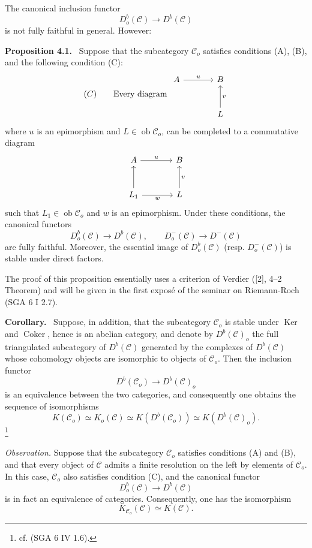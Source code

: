 \documentclass[11pt]{article}
\newenvironment{statement}[1]{\par\medskip\noindent\textbf{#1.}\ }{\par\medskip}
\providecommand{\Ker}{\operatorname{Ker}}
\providecommand{\Coker}{\operatorname{Coker}}
\providecommand{\Ob}{\operatorname{ob}}
\providecommand{\cC}{\mathcal C}
\providecommand{\Ker}{\operatorname{Ker}}
\providecommand{\Coker}{\operatorname{Coker}}
\providecommand{\Ker}{\operatorname{Ker}}
\providecommand{\Coker}{\operatorname{Coker}}
\providecommand{\Ob}{\operatorname{ob}}
\providecommand{\cC}{\mathcal C}
\providecommand{\Ob}{\operatorname{Ob}}
\providecommand{\Ob}{\operatorname{ob}}
\providecommand{\Ob}{\operatorname{Ob}}
\begin{document}
The canonical inclusion functor
\[
D_o^b(\cC)\longrightarrow D^b(\cC)
\]
is not fully faithful in general. However:

\begin{statement}{Proposition 4.1}
Suppose that the subcategory $\cC_o$ satisfies conditions (A), (B), and the following condition (C):
\[
(C)\qquad
\text{Every diagram }
\begin{tikzcd}[column sep=large,row sep=large]
A \arrow[r,"u"]&B\\
&L \arrow[u,"v"']
\end{tikzcd}
\]
where $u$ is an epimorphism and $L\in\Ob\cC_o$, can be completed to a commutative diagram
\[
\begin{tikzcd}[column sep=large,row sep=large]
A \arrow[r,"u"]&B\\
L_1 \arrow[u] \arrow[r,"w"']&L \arrow[u,"v"']
\end{tikzcd}
\]
such that $L_1\in\Ob\cC_o$ and $w$ is an epimorphism. Under these conditions, the canonical functors
\[
D_o^b(\cC)\longrightarrow D^b(\cC),\qquad
D_o^-(\cC)\longrightarrow D^-(\cC)
\]
are fully faithful. Moreover, the essential image of $D_o^b(\cC)$ (resp. $D_o^-(\cC)$) is stable under direct factors.
\end{statement}

The proof of this proposition essentially uses a criterion of Verdier ([2], 4--2 Theorem) and will be given in the first exposé of the seminar on Riemann-Roch (SGA 6 I 2.7).

\begin{statement}{Corollary}
Suppose, in addition, that the subcategory $\cC_o$ is stable under $\Ker$ and $\Coker$, hence is an abelian category, and denote by $D^b(\cC)_o$ the full triangulated subcategory of $D^b(\cC)$ generated by the complexes of $D^b(\cC)$ whose cohomology objects are isomorphic to objects of $\cC_o$. Then the inclusion functor
\[
D^b(\cC_o)\longrightarrow D^b(\cC)_o
\]
is an equivalence between the two categories, and consequently one obtains the sequence of isomorphisms
\[
K(\cC_o)\simeq K_o(\cC)\simeq K(D^b(\cC_o))\simeq K(D^b(\cC)_o).
\tag{*}
\]
\footnote{cf. (SGA 6 IV 1.6).}
\end{statement}

\emph{Observation.} Suppose that the subcategory $\cC_o$ satisfies conditions (A) and (B), and that every object of $\cC$ admits a finite resolution on the left by elements of $\cC_o$. In this case, $\cC_o$ also satisfies condition (C), and the canonical functor
\[
D_o^b(\cC)\longrightarrow D^b(\cC)
\]
is in fact an equivalence of categories. Consequently, one has the isomorphism
\[
K_{\cC_o}(\cC)\simeq K(\cC).
\]
\end{document}
